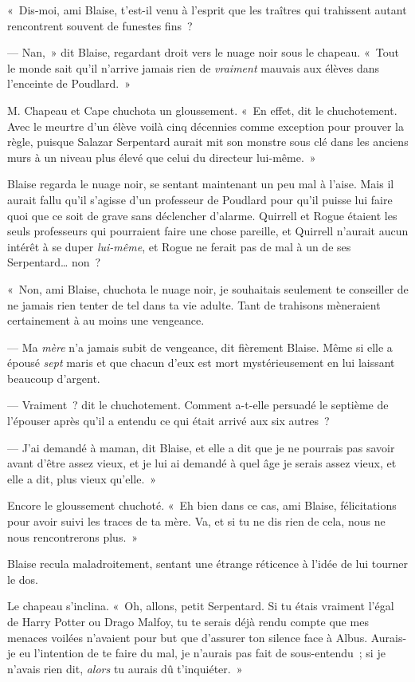 «~Dis-moi, ami Blaise, t'est-il venu à l'esprit que les traîtres qui trahissent autant rencontrent souvent de funestes fins~?

--- Nan,~» dit Blaise, regardant droit vers le nuage noir sous le chapeau. «~Tout le monde sait qu'il n'arrive jamais rien de \emph{vraiment} mauvais aux élèves dans l'enceinte de Poudlard.~»

M. Chapeau et Cape chuchota un gloussement. «~En effet, dit le chuchotement. Avec le meurtre d'un élève voilà cinq décennies comme exception pour prouver la règle, puisque Salazar Serpentard aurait mit son monstre sous clé dans les anciens murs à un niveau plus élevé que celui du directeur lui-même.~»

Blaise regarda le nuage noir, se sentant maintenant un peu mal à l'aise. Mais il aurait fallu qu'il s'agisse d'un professeur de Poudlard pour qu'il puisse lui faire quoi que ce soit de grave sans déclencher d'alarme. Quirrell et Rogue étaient les seuls professeurs qui pourraient faire une chose pareille, et Quirrell n'aurait aucun intérêt à se duper \emph{lui-même}, et Rogue ne ferait pas de mal à un de ses Serpentard… non~?

«~Non, ami Blaise, chuchota le nuage noir, je souhaitais seulement te conseiller de ne jamais rien tenter de tel dans ta vie adulte. Tant de trahisons mèneraient certainement à au moins une vengeance.

--- Ma \emph{mère} n'a jamais subit de vengeance, dit fièrement Blaise. Même si elle a épousé \emph{sept} maris et que chacun d'eux est mort mystérieusement en lui laissant beaucoup d'argent.

--- Vraiment~? dit le chuchotement. Comment a-t-elle persuadé le septième de l'épouser après qu'il a entendu ce qui était arrivé aux six autres~?

--- J'ai demandé à maman, dit Blaise, et elle a dit que je ne pourrais pas savoir avant d'être assez vieux, et je lui ai demandé à quel âge je serais assez vieux, et elle a dit, plus vieux qu'elle.~»

Encore le gloussement chuchoté. «~Eh bien dans ce cas, ami Blaise, félicitations pour avoir suivi les traces de ta mère. Va, et si tu ne dis rien de cela, nous ne nous rencontrerons plus.~»

Blaise recula maladroitement, sentant une étrange réticence à l'idée de lui tourner le dos.

Le chapeau s'inclina. «~Oh, allons, petit Serpentard. Si tu étais vraiment l'égal de Harry Potter ou Drago Malfoy, tu te serais déjà rendu compte que mes menaces voilées n'avaient pour but que d'assurer ton silence face à Albus. Aurais-je eu l'intention de te faire du mal, je n'aurais pas fait de sous-entendu~; si je n'avais rien dit, \emph{alors} tu aurais dû t'inquiéter.~»

